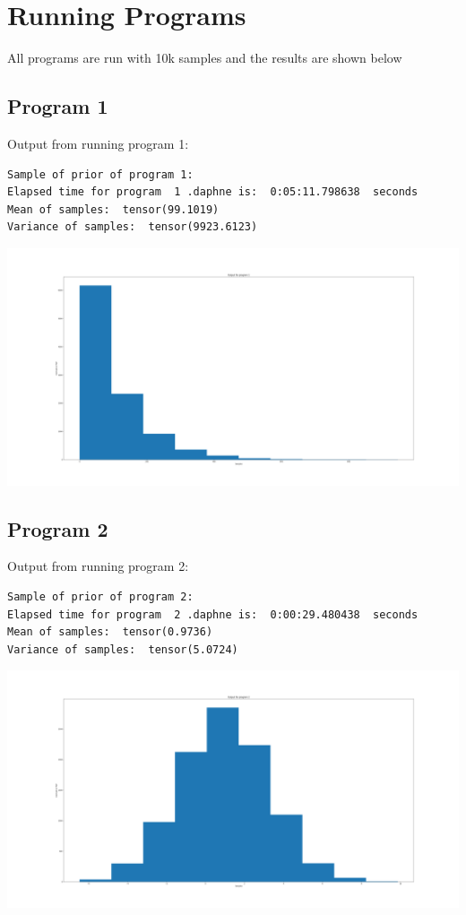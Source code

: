 \documentclass[]{article}
\begin{document}
\section{Running Programs}
All programs are run with 10k samples and the results are shown below
\subsection{Program 1}
Output from running program 1:
\begin{verbatim}
Sample of prior of program 1:
Elapsed time for program  1 .daphne is:  0:05:11.798638  seconds
Mean of samples:  tensor(99.1019)
Variance of samples:  tensor(9923.6123)
\end{verbatim}
\begin{center}
	\includegraphics[width=\linewidth]{Figures/P1Hist.png}
\end{center}

\subsection{Program 2}
Output from running program 2:
\begin{verbatim}
Sample of prior of program 2:
Elapsed time for program  2 .daphne is:  0:00:29.480438  seconds
Mean of samples:  tensor(0.9736)
Variance of samples:  tensor(5.0724)
\end{verbatim}
\begin{center}
	\includegraphics[width=\linewidth]{Figures/P2Hist.png}
\end{center}
\end{document}
